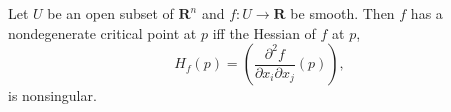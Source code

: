 Let $U$ be an open subset of $\mathbf{R}^n$ and $f: U \to \mathbf{R}$ be smooth. Then $f$ has a nondegenerate critical point at $p$ iff the Hessian of $f$ at $p$,
$$H_f(p) = \left(\frac{\partial^2 f}{\partial x_i \partial x_j}(p)\right),$$
is nonsingular.
